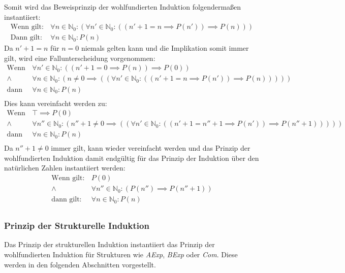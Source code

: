 \documentclass[a4paper, 11pt, accentcolor = tud3b]{tudreport}
\begin{document}
					    Somit wird das Beweisprinzip der wohlfundierten Induktion folgendermaßen instantiiert:
					    \begin{align*}
						    \text{Wenn gilt:} & \,\forall n \in \mathbb{N} _ 0 : (\forall n' \in \mathbb{N} _ 0 : ((n' + 1 = n \implies P(n')) \implies P(n))) \\
						    \text{Dann gilt:} & \,\forall n \in \mathbb{N} _ 0 : P(n)
					    \end{align*}
					    Da $ n' + 1 = n $ für $ n = 0 $ niemals gelten kann und die Implikation somit immer gilt, wird eine Fallunterscheidung vorgenommen:
					    \begin{align*}
						    \text{Wenn gilt:} & \,\forall n' \in \mathbb{N} _ 0 : ((n' + 1 = 0 \implies P(n)) \implies P(0)) \\
							\land & \,\forall n \in \mathbb{N} _ 0 : (n \neq 0 \implies ((\forall n' \in \mathbb{N} _ 0 : ((n' + 1 = n \implies P(n')) \implies P(n))))) \\
							\text{dann gilt:} & \,\forall n \in \mathbb{N} _ 0 : P(n) \\
					    \end{align*}
						Dies kann vereinfacht werden zu:
						\begin{align*}
							\text{Wenn gilt:} & \,\top \implies P(0) \\
							\land & \,\forall n'' \in \mathbb{N} _ 0 : (n'' + 1 \neq 0 \implies ((\forall n' \in \mathbb{N} _ 0 : ((n' + 1 = n'' + 1 \implies P(n')) \implies P(n'' + 1))))) \\
							\text{dann gilt:} & \,\forall n \in \mathbb{N} _ 0 : P(n) \\
						\end{align*}
						Da $ n'' + 1 \neq 0 $ immer gilt, kann wieder vereinfacht werden und das Prinzip der wohlfundierten Induktion damit endgültig für das Prinzip der Induktion über den natürlichen Zahlen instantiiert werden:
						\begin{align*}
							\text{Wenn gilt:} & \,P(0) \\
							\land & \,\forall n'' \in \mathbb{N} _ 0 : (P(n'') \implies P(n'' + 1)) \\
							\text{dann gilt:} & \,\forall n \in \mathbb{N} _ 0 : P(n) \\
						\end{align*}
			    
			    \subsubsection{Prinzip der Strukturelle Induktion}
					Das Prinzip der strukturellen Induktion instantiiert das Prinzip der wohlfundierten Induktion für Strukturen wie \textit{AExp}, \textit{BExp} oder \textit{Com}. Diese werden in den folgenden Abschnitten vorgestellt.
					
\end{document}
